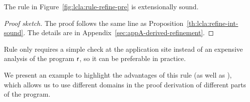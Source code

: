 \begin{prop}\label{th:lcla:refine-pre-sound}
	The rule  in Figure~\ref{fig:lcla:rule-refine-pre} is extensionally sound.
\end{prop}
\begin{proof}[Proof sketch]
	The proof follows the same line as Proposition~\ref{th:lcla:refine-int-sound}. The details are in Appendix~\ref{sec:appA-derived-refinement}.
\end{proof}

Rule  only requires a simple check at the application site instead of an expensive analysis of the program $\mathsf{r}$, so it can be preferable in practice.

We present an example to highlight the advantages of this rule (as well as ), which allows us to use different domains in the proof derivation of different parts of the program.

